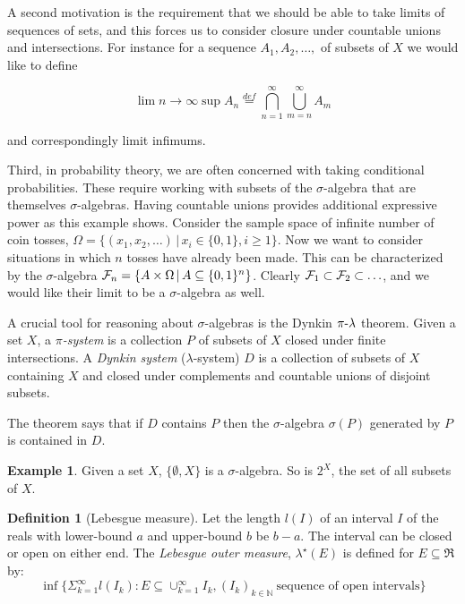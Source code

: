 \documentclass{article}
\newcommand{\alt}{\,|\,}
\newcommand{\defeq}{\stackrel{{\scriptscriptstyle def}}{=}}
\theoremstyle{definition}
\newtheorem{definition}{Definition}[section]
\newtheorem*{example}{Example}
\newcommand{\mymathhyphen}{{\hbox{-}}}
\begin{document}
A second motivation is the requirement that we should be able to take limits of sequences of sets, and this forces us to consider closure under countable unions and intersections. For instance for a sequence \(A_1, A_2, \ldots, \) of subsets of \(X\) we would like to define

\[ \lim{n \to \infty} \sup{} A_n \defeq \bigcap_{n=1}^{\infty} \bigcup_{m=n}^{\infty} A_m
\]

\noindent and correspondingly  limit infimums.

Third, in probability theory, we are often concerned with taking conditional probabilities. These require working with subsets of the \(\sigma\)-algebra that are themselves \(\sigma\)-algebras. Having countable unions provides additional expressive power as this example shows. Consider the sample space of infinite number of coin tosses, \(\Omega=\{(x_1,x_2,\ldots)\alt x_i \in \{0,1\}, i \geq 1\}\). Now we want to consider situations in which \(n\) tosses have already been made. This can be characterized by the \(\sigma\)-algebra \({\cal F}_n = \{A \times \Omega \alt A \subseteq \{0,1\}^n\}\). Clearly \({\cal F}_1 \subset {\cal F}_2 \subset \ldots\), and we would like their limit to be a \(\sigma\)-algebra as well.

A crucial tool for reasoning about \(\sigma\)-algebras is the Dynkin \(\pi\mymathhyphen{}\lambda\) theorem. Given a set \(X\), a {\em \(\pi\)-system} is a collection \(P\) of subsets of \(X\) closed under finite intersections. A {\em Dynkin system} (\(\lambda\)-system) \(D\) is a collection of subsets of \(X\) containing \(X\) and closed under complements and countable unions of disjoint subsets.

The theorem says that if \(D\) contains \(P\) then the \(\sigma\)-algebra \(\sigma(P)\) generated by \(P\) is contained in \(D\).

\begin{example}
  Given a set \(X\), \(\{\emptyset, X\}\) is a \(\sigma\)-algebra. So is \(2^X\), the set of all subsets of \(X\).
\end{example}

\begin{definition}[Lebesgue measure]
  Let the length \(l(I)\) of an interval \(I\) of the reals with lower-bound \(a\) and upper-bound \(b\) be \(b-a\). The interval can be closed or open on either end. The {\em Lebesgue outer measure}, \(\lambda^{\star}(E)\) is defined for \(E\subseteq \Re\) by:
  \[ \inf{} \{\Sigma_{k=1}^{\infty} l(I_k) : E \subseteq \cup_{k=1}^{\infty} I_k, (I_k)_{k \in \mathbb{N}}\ \mbox{sequence of open intervals}\}\]    
\end{definition}
\end{document}
